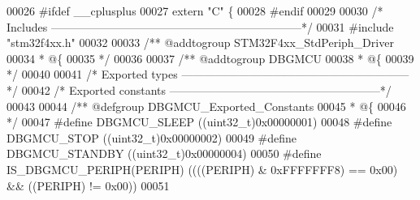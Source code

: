 \begin{DoxyCode}
00026 \textcolor{preprocessor}{#}\textcolor{preprocessor}{ifdef} \_\_cplusplus
00027  \textcolor{keyword}{extern} \textcolor{stringliteral}{"C"} \{
00028 \textcolor{preprocessor}{#}\textcolor{preprocessor}{endif}
00029 
00030 \textcolor{comment}{/* Includes ------------------------------------------------------------------*/}
00031 \textcolor{preprocessor}{#}\textcolor{preprocessor}{include} "stm32f4xx.h"
00032 
00033 \textcolor{comment}{/** @addtogroup STM32F4xx\_StdPeriph\_Driver}
00034 \textcolor{comment}{  * @\{}
00035 \textcolor{comment}{  */}
00036 
00037 \textcolor{comment}{/** @addtogroup DBGMCU}
00038 \textcolor{comment}{  * @\{}
00039 \textcolor{comment}{  */}
00040 
00041 \textcolor{comment}{/* Exported types ------------------------------------------------------------*/}
00042 \textcolor{comment}{/* Exported constants --------------------------------------------------------*/}
00043 
00044 \textcolor{comment}{/** @defgroup DBGMCU\_Exported\_Constants}
00045 \textcolor{comment}{  * @\{}
00046 \textcolor{comment}{  */}
00047 \textcolor{preprocessor}{#}\textcolor{preprocessor}{define} \textcolor{preprocessor}{DBGMCU\_SLEEP}                 \textcolor{preprocessor}{(}\textcolor{preprocessor}{(}\textcolor{preprocessor}{uint32\_t}\textcolor{preprocessor}{)}0x00000001\textcolor{preprocessor}{)}
00048 \textcolor{preprocessor}{#}\textcolor{preprocessor}{define} \textcolor{preprocessor}{DBGMCU\_STOP}                  \textcolor{preprocessor}{(}\textcolor{preprocessor}{(}\textcolor{preprocessor}{uint32\_t}\textcolor{preprocessor}{)}0x00000002\textcolor{preprocessor}{)}
00049 \textcolor{preprocessor}{#}\textcolor{preprocessor}{define} \textcolor{preprocessor}{DBGMCU\_STANDBY}               \textcolor{preprocessor}{(}\textcolor{preprocessor}{(}\textcolor{preprocessor}{uint32\_t}\textcolor{preprocessor}{)}0x00000004\textcolor{preprocessor}{)}
00050 \textcolor{preprocessor}{#}\textcolor{preprocessor}{define} \textcolor{preprocessor}{IS\_DBGMCU\_PERIPH}\textcolor{preprocessor}{(}\textcolor{preprocessor}{PERIPH}\textcolor{preprocessor}{)} \textcolor{preprocessor}{(}\textcolor{preprocessor}{(}\textcolor{preprocessor}{(}\textcolor{preprocessor}{(}\textcolor{preprocessor}{PERIPH}\textcolor{preprocessor}{)} \textcolor{preprocessor}{&} 0xFFFFFFF8\textcolor{preprocessor}{)} \textcolor{preprocessor}{==} 0x00\textcolor{preprocessor}{)} \textcolor{preprocessor}{&&} \textcolor{preprocessor}{(}\textcolor{preprocessor}{(}\textcolor{preprocessor}{PERIPH}\textcolor{preprocessor}{)} \textcolor{preprocessor}{!=} 0x00\textcolor{preprocessor}{)}\textcolor{preprocessor}{)}
00051 

\end{DoxyCode}
